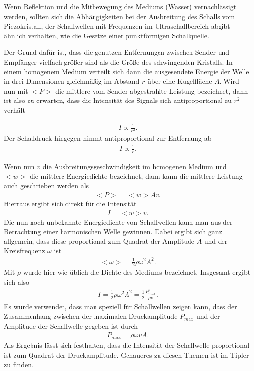 \documentclass[12pt,a4paper,titlepage,headinclude,bibtotoc]{scrartcl}
\begin{document}
Wenn Reflektion und die Mitbewegung des Mediums (Wasser) vernachlässigt werden, sollten sich die Abhängigkeiten bei der Ausbreitung des Schalls vom Piezokristall, der Schallwellen mit Frequenzen im Ultraschallbereich abgibt
ähnlich verhalten, wie die Gesetze einer punktförmigen Schallquelle.

Der Grund dafür ist, dass die genutzen Entfernungen zwischen Sender und Empfänger vielfach größer sind als die Größe des schwingenden Kristalls. 
In einem homogenem Medium verteilt sich dann die ausgesendete Energie der Welle in drei Dimensionen gleichmäßig im Abstand $r$ über eine Kugelfläche $A$. Wird nun mit $<P>$ die mittlere vom Sender abgestrahlte Leistung 
bezeichnet, dann ist also zu erwarten, dass die Intensität des Signals sich antiproportional zu $r^2$ verhält

\begin{align}
 I \propto \frac{1}{r^2}.
\end{align}
Der Schalldruck hingegen nimmt antiproportional zur Entfernung ab
\begin{align}
 I \propto \frac{1}{r}.
\end{align}


Wenn nun $v$ die Ausbreitungsgeschwindigkeit im homogenen Medium und $<w>$ die mittlere Energiedichte bezeichnet, dann kann die mittlere Leistung auch geschrieben werden als
\begin{align}
 <P>  = <w> A v.
\end{align}
Hierraus ergibt sich direkt für die Intensität
\begin{align}
 I = <w> v.
\end{align}
Die nun noch unbekannte Energiedichte von Schallwellen kann man aus der Betrachtung einer harmonischen Welle gewinnen. Dabei ergibt sich ganz allgemein, dass diese 
proportional zum Quadrat der Amplitude $A$ und der Kreisfrequenz $\omega$ ist
\begin{align}
 <\omega> = \frac{1}{2} \rho \omega^2 A^2.
\end{align}
Mit $\rho$ wurde hier wie üblich die Dichte des Mediums bezeichnet.
Insgesamt ergibt sich also 
\begin{align}
 I = \frac{1}{2} \rho \omega^2 A^2 = \frac{1}{2} \frac{P_{max}^2}{\rho v}.
\end{align}
Es wurde verwendet, dass man speziell für Schallwellen zeigen kann, dass der Zusammenhang zwischen der maximalen Druckamplitude $P_{max}$ und der Amplitude der Schallwelle gegeben ist durch
\begin{align}
 P_{max} = \rho \omega v A.
\end{align}
Als Ergebnis lässt sich festhalten, dass die Intensität der Schallwelle proportional ist zum Quadrat der Druckamplitude. Genaueres zu diesen Themen ist im Tipler \cite[S.598]{tipler} zu finden.
\end{document}
